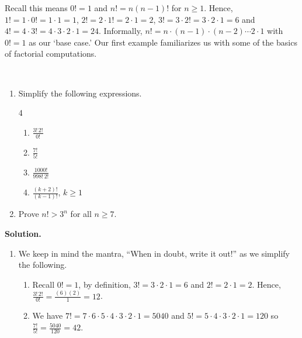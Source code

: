 \documentclass{ximera}
\begin{document}
Recall this means $0! = 1$ and $n! = n(n-1)!$ for $n \geq 1$.  Hence, $1! = 1 \cdot 0! = 1 \cdot 1 = 1$, $2! = 2 \cdot 1! = 2 \cdot 1 = 2$, $3! = 3 \cdot 2! = 3 \cdot 2 \cdot 1 = 6$ and  $4! = 4 \cdot 3! = 4 \cdot 3 \cdot 2 \cdot 1 = 24$. Informally, $n! = n\cdot(n -1)\cdot(n -2) \cdots 2 \cdot 1$ with $0! = 1$ as our `base case.'  Our first example familiarizes us with some of the basics of factorial computations.

\begin{example}  \label{factorialex}  $~$

\begin{enumerate} 

\item  Simplify the following expressions.

\begin{multicols}{4}

\begin{enumerate}

\item  $\frac{3! \, 2!}{0!}$

\item  $\frac{7!}{5!}$

\item  $\frac{1000!}{998! \, 2!}$

\item  $\frac{(k+2)!}{(k-1)!}$, $k \geq 1$

\end{enumerate}

\end{multicols}

\item  Prove $n! > 3^n$ for all $n \geq 7$.

\end{enumerate}

{\bf Solution.}  

\begin{enumerate}

\item  We keep in mind the mantra, ``When in doubt, write it out!'' as we simplify the following.

\begin{enumerate}

\item  Recall $0! = 1$, by definition,  $3! = 3 \cdot 2 \cdot 1 = 6$ and $2! = 2 \cdot 1 = 2$. Hence, $\frac{3! \, 2!}{0!} = \frac{(6)(2)}{1} = 12$.

\item We have $7! = 7 \cdot 6 \cdot 5 \cdot 4 \cdot 3 \cdot 2 \cdot 1 = 5040$ and $5! = 5 \cdot 4 \cdot 3 \cdot 2 \cdot 1 = 120$ so $\frac{7!}{5!} = \frac{5040}{120} = 42$. 


\end{enumerate}
\end{enumerate}
\end{example}
\end{document}
